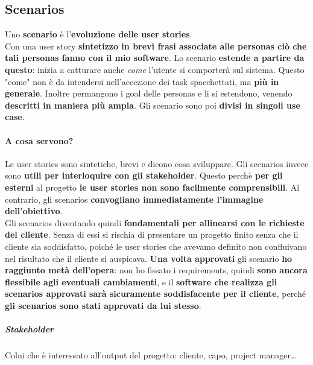 \documentclass[10pt]{article}
\begin{document}
\subsection{Scenarios}
Uno \textbf{scenario} è l'\textbf{evoluzione delle user stories}.\\
Con una user story \textbf{sintetizzo in brevi frasi associate alle personas ciò che tali personas fanno con il mio software}. Lo scenario \textbf{estende a partire da questo}: inizia a catturare anche \textit{come} l'utente si comporterà sul sistema. Questo "come" non è da intendersi nell'accezione dei task spacchettati, ma  \textbf{più in generale}. Inoltre permangono i goal delle personas e li si estendono, venendo \textbf{descritti in maniera più ampia}. Gli scenario sono poi \textbf{divisi in singoli use case}.
\paragraph{A cosa servono?} Le user stories sono sintetiche, brevi e dicono cosa sviluppare. Gli scenarios invece sono \textbf{utili per interloquire con gli stakeholder}. Questo perchè \textbf{per gli esterni} al progetto \textbf{le user stories non sono facilmente comprensibili}. Al contrario, gli scenarios \textbf{convogliano immediatamente l'immagine dell'obiettivo}.\\
Gli scenarios diventando quindi \textbf{fondamentali per allinearsi con le richieste del cliente}. Senza di essi si rischia di presentare un progetto finito senza che il cliente sia soddisfatto, poiché le user stories che avevamo definito non confluivano nel risultato che il cliente si auspicava. \textbf{Una volta approvati} gli scenario \textbf{ho raggiunto metà dell'opera}: non ho fissato i requirements, quindi \textbf{sono ancora flessibile agli eventuali cambiamenti}, e il \textbf{software che realizza gli scenarios approvati sarà sicuramente soddisfacente per il cliente}, perché \textbf{gli scenarios sono stati approvati da lui stesso}.
\subparagraph{Stakeholder} Colui che è interessato all'output del progetto: cliente, capo, project manager\ldots
\end{document}
